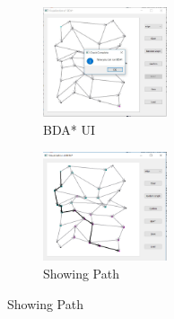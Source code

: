 \begin{figure}[h]
     \centering
     \begin{subfigure}{}
        \includegraphics[width=0.4\textwidth]{Capture1.PNG}
        \caption{BDA* UI}
        \label{fig:1}
     \end{subfigure}
     \begin{subfigure}{}
        \includegraphics[width=0.4\textwidth]{Capture2.PNG}
        \caption{Showing Path}
        \label{fig:1}
        \end{subfigure}
     \end{figure}
